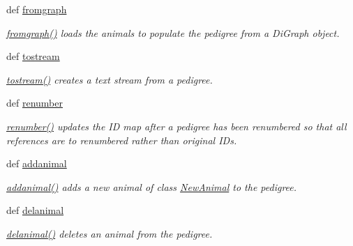 \begin{DoxyCompactItemize}
def \hyperlink{classPyPedal_1_1pyp__newclasses_1_1NewPedigree_a9d014c1ead82bb6abe3085058086194a}{fromgraph}
\begin{DoxyCompactList}\small\item\em \hyperlink{classPyPedal_1_1pyp__newclasses_1_1NewPedigree_a9d014c1ead82bb6abe3085058086194a}{fromgraph()} loads the animals to populate the pedigree from a DiGraph object. \item\end{DoxyCompactList}\item 
def \hyperlink{classPyPedal_1_1pyp__newclasses_1_1NewPedigree_a7b8f4dca3f231f6d487fee90e38e21c7}{tostream}
\begin{DoxyCompactList}\small\item\em \hyperlink{classPyPedal_1_1pyp__newclasses_1_1NewPedigree_a7b8f4dca3f231f6d487fee90e38e21c7}{tostream()} creates a text stream from a pedigree. \item\end{DoxyCompactList}\item 
def \hyperlink{classPyPedal_1_1pyp__newclasses_1_1NewPedigree_aef198ff1c3c2ac1c666486deb2d2e92a}{renumber}
\begin{DoxyCompactList}\small\item\em \hyperlink{classPyPedal_1_1pyp__newclasses_1_1NewPedigree_aef198ff1c3c2ac1c666486deb2d2e92a}{renumber()} updates the ID map after a pedigree has been renumbered so that all references are to renumbered rather than original IDs. \item\end{DoxyCompactList}\item 
def \hyperlink{classPyPedal_1_1pyp__newclasses_1_1NewPedigree_a6537e2f0a419e0736b500c560b9f6194}{addanimal}
\begin{DoxyCompactList}\small\item\em \hyperlink{classPyPedal_1_1pyp__newclasses_1_1NewPedigree_a6537e2f0a419e0736b500c560b9f6194}{addanimal()} adds a new animal of class \hyperlink{classPyPedal_1_1pyp__newclasses_1_1NewAnimal}{NewAnimal} to the pedigree. \item\end{DoxyCompactList}\item 
def \hyperlink{classPyPedal_1_1pyp__newclasses_1_1NewPedigree_a646940eb2010d378c761e3c8c0e584e6}{delanimal}
\begin{DoxyCompactList}\small\item\em \hyperlink{classPyPedal_1_1pyp__newclasses_1_1NewPedigree_a646940eb2010d378c761e3c8c0e584e6}{delanimal()} deletes an animal from the pedigree. \item\end{DoxyCompactList}\item 

\end{DoxyCompactItemize}
